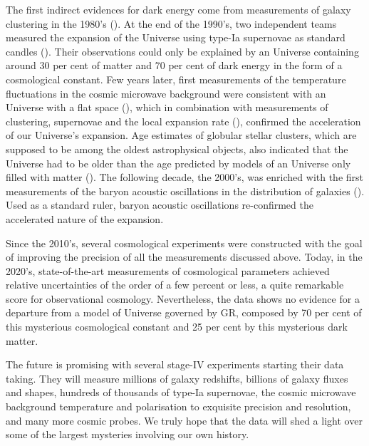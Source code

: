     The first indirect evidences for dark energy come from measurements 
    of galaxy clustering in the 1980's 
    (\cite{peeblesTestsCosmologicalModels1984,
    maddoxGalaxyCorrelationsLarge1990, 
    efstathiouCosmologicalConstantCold1990}). 
    At the end of the 1990's, two independent teams measured the expansion of 
    the Universe using type-Ia supernovae as standard candles
    (\cite{riessObservationalEvidenceSupernovae1998, 
    perlmutterMeasurementsOmegaLambda1999}). 
    Their observations could only be explained by 
    an Universe containing around 30 per cent of matter and 70 per cent of dark energy
    in the form of a cosmological constant. 
    Few years later, first measurements of the 
    temperature fluctuations in the cosmic microwave background were consistent with 
    an Universe with a flat space (\cite{balbiConstraintsCosmologicalParameters2000,
    debernardisFlatUniverse2000}), 
    which in combination with measurements of clustering, 
    supernovae and the local expansion rate (\cite{mouldHubbleSpaceTelescope2000}), 
    confirmed the acceleration of our Universe's expansion. 
    Age estimates of globular stellar clusters, which are
    supposed to be among the oldest astrophysical objects, 
    also indicated that the Universe had to be older than the age predicted 
    by models of an Universe only filled with matter (\cite{chaboyerAgeUniverse1998}). 
    The following decade, the 2000's, was enriched with the first measurements
    of the baryon acoustic oscillations in the distribution of galaxies
    (\cite{eisensteinDetectionBaryonAcoustic2005, cole2dFGalaxyRedshift2005}).
    Used as a standard ruler, baryon acoustic oscillations re-confirmed 
    the accelerated nature of the expansion.
    
    Since the 2010's, several cosmological experiments were constructed with the goal of
    improving the precision of all the measurements discussed above. 
    Today, in the 2020's, state-of-the-art measurements of cosmological parameters 
    achieved relative uncertainties of the order of a few percent or less, 
    a quite remarkable score for observational cosmology. 
    Nevertheless, the data shows no evidence for a departure from a model of Universe 
    governed by GR, composed by 70 per cent of this mysterious cosmological 
    constant and 25 per cent by this mysterious dark matter. 

    The future is promising with several stage-IV experiments starting their data taking.
    They will measure millions of galaxy redshifts, billions of galaxy fluxes and shapes, 
    hundreds of thousands of type-Ia supernovae, 
    the cosmic microwave background temperature and polarisation to exquisite 
    precision and resolution, and many more cosmic probes. 
    We truly hope that the data will shed a light over some of the largest mysteries 
    involving our own history. 



